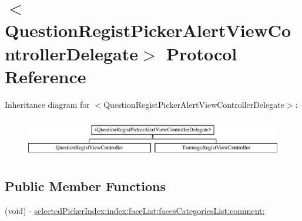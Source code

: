 \hypertarget{protocol_question_regist_picker_alert_view_controller_delegate-p}{
\section{$<$QuestionRegistPickerAlertViewControllerDelegate$>$ Protocol Reference}
\label{protocol_question_regist_picker_alert_view_controller_delegate-p}
}
Inheritance diagram for $<$QuestionRegistPickerAlertViewControllerDelegate$>$:\begin{figure}[H]
\begin{center}
\leavevmode
\includegraphics[height=1.777778cm]{protocol_question_regist_picker_alert_view_controller_delegate-p}
\end{center}
\end{figure}
\subsection*{Public Member Functions}
\begin{DoxyCompactItemize}
\item 
(void) -\/ \hyperlink{protocol_question_regist_picker_alert_view_controller_delegate-p_a1c8f3f71c2b3a414d3b2f351dead8fd3}{selectedPickerIndex:index:faceList:facesCategoriesList:comment:}
\end{DoxyCompactItemize}


